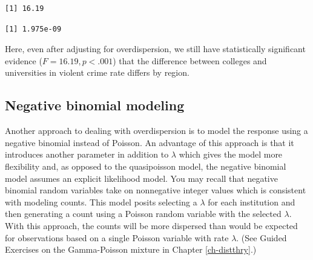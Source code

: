 \documentclass[
]{krantz}
\newenvironment{Shaded}{\begin{snugshade}}{\end{snugshade}}
\newcommand{\DataTypeTok}[1]{\textcolor[rgb]{0.27,0.27,0.27}{#1}}
\newcommand{\DecValTok}[1]{\textcolor[rgb]{0.06,0.06,0.06}{#1}}
\newcommand{\KeywordTok}[1]{\textcolor[rgb]{0.27,0.27,0.27}{\textbf{#1}}}
\newcommand{\NormalTok}[1]{#1}
\newcommand{\OperatorTok}[1]{\textcolor[rgb]{0.43,0.43,0.43}{\textbf{#1}}}
\newcommand{\StringTok}[1]{\textcolor[rgb]{0.5,0.5,0.5}{#1}}
\begin{document}
\begin{Shaded}
\end{Shaded}

\begin{verbatim}
[1] 16.19
\end{verbatim}

\begin{Shaded}
\end{Shaded}

\begin{verbatim}
[1] 1.975e-09
\end{verbatim}

Here, even after adjusting for overdispersion, we still have statistically significant evidence (\(F=16.19, p<.001\)) that the difference between colleges and universities in violent crime rate differs by region.

\hypertarget{negative-binomial-modeling}{%
\subsection{Negative binomial modeling}\label{negative-binomial-modeling}}

Another approach to dealing with overdispersion is to model the response using a negative binomial instead of Poisson. An advantage of this approach is that it introduces another parameter in addition to \(\lambda\) which gives the model more flexibility and, as opposed to the quasipoisson model, the negative binomial model assumes an explicit likelihood model. You may recall that negative binomial random variables take on nonnegative integer values which is consistent with modeling counts. This model posits selecting a \(\lambda\) for each institution and then generating a count using a Poisson random variable with the selected \(\lambda\). With this approach, the counts will be more dispersed than would be expected for observations based on a single Poisson variable with rate \(\lambda\). (See Guided Exercises on the Gamma-Poisson mixture in Chapter \ref{ch-distthry}.)
\end{document}
